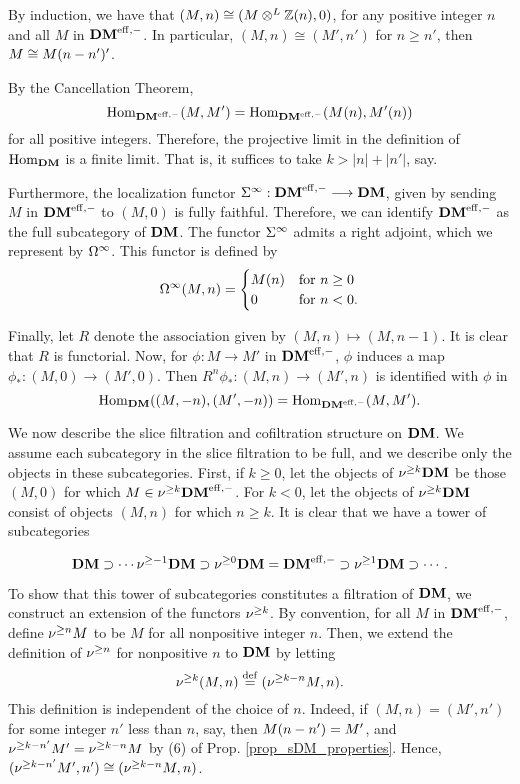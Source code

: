 \begin{rmk}
By induction, we have that $(M, n) \cong (M \tDM \Z(n), 0)$, for 
any positive integer $n$ and all $M$ in $\DMeff$. In particular,
$(M, n) \cong (M', n')$ for $n \geq n'$, then $M \cong 
\tZ[n - n']M'$.
\end{rmk}

\begin{rmk}\label{rmk_homs_in_DM}
By the Cancellation Theorem, 
\[
\homDMf(M, M') = \homDMf(\tZ[n]{M}, \tZ[n]{M'})
\]
for all positive integers. Therefore, the projective limit in the 
definition of $\homDM$ is a finite limit. That is, it suffices to 
take $k > |n| + |n'|$, say.

Furthermore, the localization functor $\spectDM: \DMeff \to \DM$, 
given by sending $M$ in $\DMeff$ to $(M, 0)$ is fully faithful. 
Therefore, we can identify $\DMeff$ as the full subcategory of 
$\DM$. The functor $\spectDM$ admits a right adjoint, which we 
represent by $\loopDM$. This functor is defined by 
\[
\loopDM(M, n) = \begin{cases}
\LHI[n]{M} &\textrm{for }n \geq 0 \\
0 &\textrm{for }n < 0.
\end{cases}
\]

Finally, let $R$ denote the association given by $(M, n) \mapsto
(M, n - 1)$. It is clear that $R$ is functorial. Now, for $\phi: 
M \to M'$ in $\DMeff$, $\phi$ induces a map $\phi_*: (M, 0)
\to (M', 0)$. Then $R^n\phi_* : (M, n) \to (M', n)$ is identified 
with $\phi$ in 
\[
\homDM((M, -n), (M', -n)) = \homDMf(M, M').
\]
\end{rmk}

We now describe the slice filtration and cofiltration structure on 
$\DM$. We assume each subcategory in the slice filtration to be 
full, and we describe only the objects in these subcategories. 
First, if $k \geq 0$, let the objects of $\sgDM{k} \DM$ be those 
$(M, 0)$ for which $M \in \sgDM{k} \DMeff$. For $k < 0$, let the 
objects of $\sgDM{k} \DM$ consist of objects $(M, n)$ for which 
$n \geq k$. It is clear that we have a tower of subcategories

\begin{equation}\label{eq_DM_slice_filt}
\DM \supset \cdots \sgDM{-1}\DM \supset \sgDM{0}\DM = \DMeff 
   \supset \sgDM{1}\DM \supset \cdots.
\end{equation}

To show that this tower of subcategories constitutes a filtration
of $\DM$, we construct an extension of the functors $\sgDM{k}$.
By convention, for all $M$ in $\DMeff$, define $\sgDM{n} M$ to be 
$M$ for all nonpositive integer $n$. Then, we extend the 
definition of $\sgDM{n}$ for nonpositive $n$ to $\DM$ by letting
\[
\sgDM{k}(M, n) \defeq (\sgDM{k - n}M, n).
\]
This definition is independent of the choice of $n$. Indeed, if
$(M, n) = (M', n')$ for some integer $n'$ less than $n$, say, then
$\tZ[n - n']{M} = M'$, and $\sgDM{k - n'}M' = \sgDM{k - n}M$ by
(6) of Prop. \ref{prop_sDM_properties}. Hence, $(\sgDM{k - n'}M', 
n') \cong (\sgDM{k - n}M, n)$.


